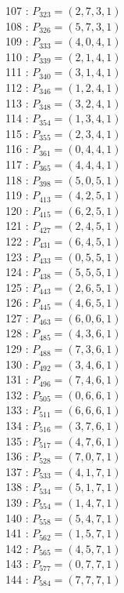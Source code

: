 \documentclass{article}
\begin{document}
{\begin{multicols}{3}
107 : $P_{323}=( 2, 7, 3, 1 )$\\
108 : $P_{326}=( 5, 7, 3, 1 )$\\
109 : $P_{333}=( 4, 0, 4, 1 )$\\
110 : $P_{339}=( 2, 1, 4, 1 )$\\
111 : $P_{340}=( 3, 1, 4, 1 )$\\
112 : $P_{346}=( 1, 2, 4, 1 )$\\
113 : $P_{348}=( 3, 2, 4, 1 )$\\
114 : $P_{354}=( 1, 3, 4, 1 )$\\
115 : $P_{355}=( 2, 3, 4, 1 )$\\
116 : $P_{361}=( 0, 4, 4, 1 )$\\
117 : $P_{365}=( 4, 4, 4, 1 )$\\
118 : $P_{398}=( 5, 0, 5, 1 )$\\
119 : $P_{413}=( 4, 2, 5, 1 )$\\
120 : $P_{415}=( 6, 2, 5, 1 )$\\
121 : $P_{427}=( 2, 4, 5, 1 )$\\
122 : $P_{431}=( 6, 4, 5, 1 )$\\
123 : $P_{433}=( 0, 5, 5, 1 )$\\
124 : $P_{438}=( 5, 5, 5, 1 )$\\
125 : $P_{443}=( 2, 6, 5, 1 )$\\
126 : $P_{445}=( 4, 6, 5, 1 )$\\
127 : $P_{463}=( 6, 0, 6, 1 )$\\
128 : $P_{485}=( 4, 3, 6, 1 )$\\
129 : $P_{488}=( 7, 3, 6, 1 )$\\
130 : $P_{492}=( 3, 4, 6, 1 )$\\
131 : $P_{496}=( 7, 4, 6, 1 )$\\
132 : $P_{505}=( 0, 6, 6, 1 )$\\
133 : $P_{511}=( 6, 6, 6, 1 )$\\
134 : $P_{516}=( 3, 7, 6, 1 )$\\
135 : $P_{517}=( 4, 7, 6, 1 )$\\
136 : $P_{528}=( 7, 0, 7, 1 )$\\
137 : $P_{533}=( 4, 1, 7, 1 )$\\
138 : $P_{534}=( 5, 1, 7, 1 )$\\
139 : $P_{554}=( 1, 4, 7, 1 )$\\
140 : $P_{558}=( 5, 4, 7, 1 )$\\
141 : $P_{562}=( 1, 5, 7, 1 )$\\
142 : $P_{565}=( 4, 5, 7, 1 )$\\
143 : $P_{577}=( 0, 7, 7, 1 )$\\
144 : $P_{584}=( 7, 7, 7, 1 )$\\
\end{multicols}


}
\end{document}
